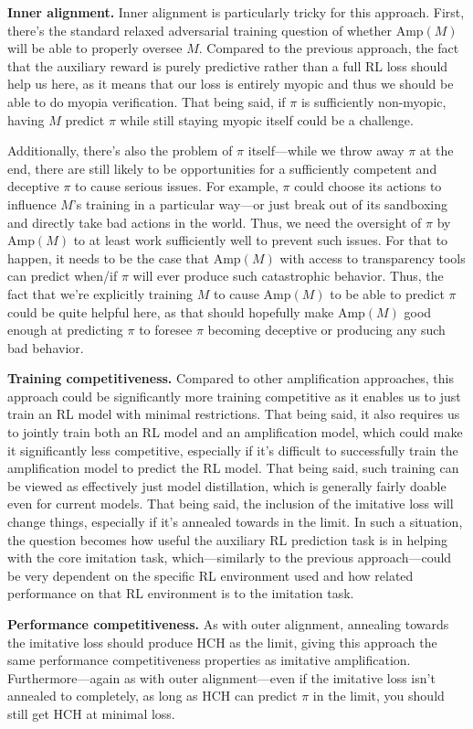 \textbf{Inner alignment.} Inner alignment is particularly tricky for this approach. First, there's the standard relaxed adversarial training question of whether $\text{Amp}(M)$ will be able to properly oversee $M$. Compared to the previous approach, the fact that the auxiliary reward is purely predictive rather than a full RL loss should help us here, as it means that our loss is entirely myopic and thus we should be able to do myopia verification\cite{TODO: cite https://www.alignmentforum.org/posts/BKM8uQS6QdJPZLqCr/towards-a-mechanistic-understanding-of-corrigibility}. That being said, if $\pi$ is sufficiently non-myopic, having $M$ predict $\pi$ while still staying myopic itself could be a challenge.

Additionally, there's also the problem of $\pi$ itself---while we throw away $\pi$ at the end, there are still likely to be opportunities for a sufficiently competent and deceptive $\pi$ to cause serious issues. For example, $\pi$ could choose its actions to influence $M$'s training in a particular way---or just break out of its sandboxing and directly take bad actions in the world. Thus, we need the oversight of $\pi$ by $\text{Amp}(M)$ to at least work sufficiently well to prevent such issues. For that to happen, it needs to be the case that $\text{Amp}(M)$ with access to transparency tools can predict when/if $\pi$ will ever produce such catastrophic behavior. Thus, the fact that we're explicitly training $M$ to cause $\text{Amp}(M)$ to be able to predict $\pi$ could be quite helpful here, as that should hopefully make $\text{Amp}(M)$ good enough at predicting $\pi$ to foresee $\pi$ becoming deceptive or producing any such bad behavior.

\textbf{Training competitiveness.} Compared to other amplification approaches, this approach could be significantly more training competitive as it enables us to just train an RL model with minimal restrictions. That being said, it also requires us to jointly train both an RL model and an amplification model, which could make it significantly less competitive, especially if it's difficult to successfully train the amplification model to predict the RL model. That being said, such training can be viewed as effectively just model distillation, which is generally fairly doable even for current models. That being said, the inclusion of the imitative loss will change things, especially if it's annealed towards in the limit. In such a situation, the question becomes how useful the auxiliary RL prediction task is in helping with the core imitation task, which---similarly to the previous approach---could be very dependent on the specific RL environment used and how related performance on that RL environment is to the imitation task.

\textbf{Performance competitiveness.} As with outer alignment, annealing towards the imitative loss should produce HCH as the limit, giving this approach the same performance competitiveness properties as imitative amplification. Furthermore---again as with outer alignment---even if the imitative loss isn't annealed to completely, as long as HCH can predict $\pi$ in the limit, you should still get HCH at minimal loss.

